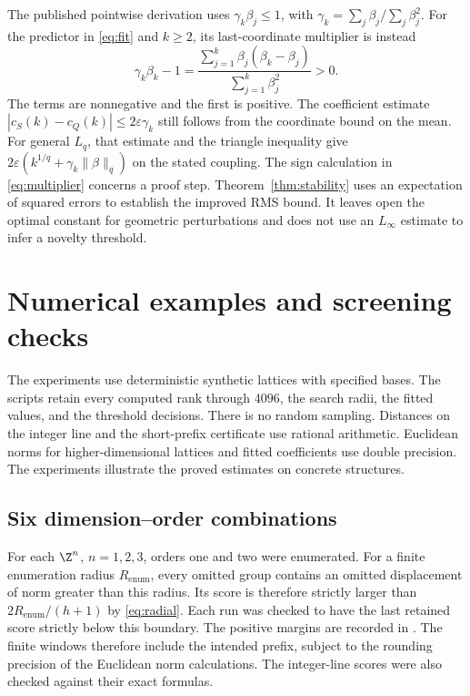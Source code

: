 \documentclass[11pt,a4paper]{article}
\theoremstyle{definition}
\begin{document}
The published pointwise derivation uses \(\gamma_k\beta_j\le1\), with \(\gamma_k=\sum_j\beta_j/\sum_j\beta_j^2\). For the predictor in \eqref{eq:fit} and \(k\ge2\), its last-coordinate multiplier is instead
\begin{equation}\label{eq:multiplier}
\gamma_k\beta_k-1
=\frac{\sum_{j=1}^k\beta_j(\beta_k-\beta_j)}{\sum_{j=1}^k\beta_j^2}>0 .
\end{equation}
The terms are nonnegative and the first is positive. The coefficient estimate \(|c_S(k)-c_Q(k)|\le2\varepsilon\gamma_k\) still follows from the coordinate bound on the mean. For general \(L_q\), that estimate and the triangle inequality give \(2\varepsilon(k^{1/q}+\gamma_k\|\beta\|_q)\) on the stated coupling. The sign calculation in \eqref{eq:multiplier} concerns a proof step. Theorem~\ref{thm:stability} uses an expectation of squared errors to establish the improved RMS bound. It leaves open the optimal constant for geometric perturbations and does not use an \(L_\infty\) estimate to infer a novelty threshold.

\section{Numerical examples and screening checks}\label{sec:experiments}

The experiments use deterministic synthetic lattices with specified bases. The scripts retain every computed rank through \(4096\), the search radii, the fitted values, and the threshold decisions. There is no random sampling. Distances on the integer line and the short-prefix certificate use rational arithmetic. Euclidean norms for higher-dimensional lattices and fitted coefficients use double precision. The experiments illustrate the proved estimates on concrete structures.

\subsection{Six dimension--order combinations}

For each \(\Z^n\), \(n=1,2,3\), orders one and two were enumerated. For a finite enumeration radius \(R_{\mathrm{enum}}\), every omitted group contains an omitted displacement of norm greater than this radius. Its score is therefore strictly larger than \(2R_{\mathrm{enum}}/(h+1)\) by \eqref{eq:radial}. Each run was checked to have the last retained score strictly below this boundary. The positive margins are recorded in . The finite windows therefore include the intended prefix, subject to the rounding precision of the Euclidean norm calculations. The integer-line scores were also checked against their exact formulas.
\end{document}
